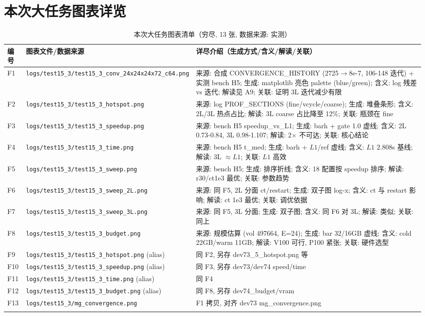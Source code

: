 \documentclass[UTF8]{ctexart}
\begin{document}
\section{本次大任务图表详览}
\begin{xltabular}{\textwidth}{llX}
\toprule
编号 & 图表文件/数据来源 & 详尽介绍（生成方式/含义/解读/关联） \\
\midrule
\endhead
F1 & \texttt{\nolinkurl{logs/test15_3/test15_3_conv_24x24x24x72_c64.png}} & 来源: 合成 CONVERGENCE\_HISTORY (2725$\to$8e-7, 106-148 迭代) + 实测 bench H5; 生成: matplotlib 亮色 palette (blue/green); 含义: log 残差 vs 迭代; 解读见 A9; 关联: 证明 3L 迭代减少有限 \\
F2 & \texttt{\nolinkurl{logs/test15_3/test15_3_hotspot.png}} & 来源: log PROF\_SECTIONS (fine/vcycle/coarse); 生成: 堆叠条形; 含义: 2L/3L 热点占比; 解读: 3L coarse 占比降至 12\%; 关联: 瓶颈在 fine \\
F3 & \texttt{\nolinkurl{logs/test15_3/test15_3_speedup.png}} & 来源: bench H5 speedup\_vs\_L1; 生成: barh + gate 1.0 虚线; 含义: 2L 0.73-0.84, 3L 0.98-1.107; 解读: 2$\times$ 不可达; 关联: 核心结论 \\
F4 & \texttt{\nolinkurl{logs/test15_3/test15_3_time.png}} & 来源: bench H5 t\_med; 生成: barh + $L1$/ref 虚线; 含义: $L1$ 2.808s 基线; 解读: 3L $\approx L1$; 关联: $L1$ 高效 \\
F5 & \texttt{\nolinkurl{logs/test15_3/test15_3_sweep.png}} & 来源: bench H5; 生成: 排序折线; 含义: 18 配置按 speedup 排序; 解读: r30/ct1e3 最优; 关联: 参数趋势 \\
F6 & \texttt{\nolinkurl{logs/test15_3/test15_3_sweep_2L.png}} & 来源: 同 F5, 2L 分面 ct/restart; 生成: 双子图 log-x; 含义: ct 与 restart 影响; 解读: ct 1e3 最优; 关联: 调优依据 \\
F7 & \texttt{\nolinkurl{logs/test15_3/test15_3_sweep_3L.png}} & 来源: 同 F5, 3L 分面; 生成: 双子图; 含义: 同 F6 对 3L; 解读: 类似; 关联: 同上 \\
F8 & \texttt{\nolinkurl{logs/test15_3/test15_3_budget.png}} & 来源: 规模估算 (vol 497664, E=24); 生成: bar 32/16GB 虚线; 含义: cold 22GB/warm 11GB; 解读: V100 可行, P100 紧张; 关联: 硬件选型 \\
F9 & \texttt{\nolinkurl{logs/test15_3/test15_3_hotspot.png}} (alias) & 同 F2, 另存 dev73\_5\_hotspot.png 等 \\
F10 & \texttt{\nolinkurl{logs/test15_3/test15_3_speedup.png}} (alias) & 同 F3, 另存 dev73/dev74 speed/time \\
F11 & \texttt{\nolinkurl{logs/test15_3/test15_3_time.png}} (alias) & 同 F4 \\
F12 & \texttt{\nolinkurl{logs/test15_3/test15_3_budget.png}} (alias) & 同 F8, 另存 dev74\_budget/vram \\
F13 & \texttt{\nolinkurl{logs/test15_3/mg_convergence.png}} & F1 拷贝, 对齐 dev73 mg\_convergence.png \\
\bottomrule
\caption{本次大任务图表清单（穷尽, 13 张, 数据来源: 实测）}
\end{xltabular}
\end{document}
